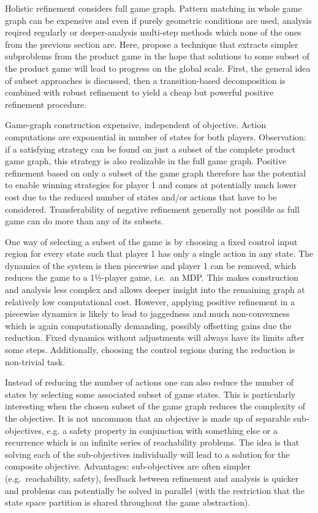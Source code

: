 Holistic refinement considers full game graph.
Pattern matching in whole game graph can be expensive and even if purely geometric conditions are used, analysis reqired regularly or deeper-analysis multi-step methods which none of the ones from the previous section are.
Here, propose a technique that extracts simpler subproblems from the product game in the hope that solutions to some subset of the product game will lead to progress on the global scale.
First, the general idea of subset approaches is discussed, then a transition-based decomposition is combined with robust refinement to yield a cheap but powerful positive refinement procedure.


\startsubsection[title={Subset Approaches}]

    Game-graph construction expensive, independent of objective.
    Action computations are exponential in number of states for both players.
    Observation: if a satisfying strategy can be found on just a subset of the complete product game graph, this strategy is also realizable in the full game graph.
    Positive refinement based on only a subset of the game graph therefore has the potential to enable winning strategies for player 1 and comes at potentially much lower cost due to the reduced number of states and/or actions that have to be considered.
    Transferability of negative refinement generally not possible as full game can do more than any of its subsets.

    One way of selecting a subset of the game is by choosing a fixed control input region for every state such that player 1 has only a single action in any state.
    The dynamics of the system is then piecewise and player 1 can be removed, which reduces the game to a 1½-player game, i.e.\ an MDP.
    This makes construction and analysis less complex and allows deeper insight into the remaining graph at relatively low computational cost.
    However, applying positive refinement in a piecewise dynamics is likely to lead to jaggedness and much non-convexness which is again computationally demanding, possibly offsetting gains due the reduction.
    Fixed dynamics without adjustments will always have its limits after some steps.
    Additionally, choosing the control regions during the reduction is non-trivial task.

    Instead of reducing the number of actions one can also reduce the number of states by selecting some associated subset of game states.
    This is particularly interesting when the chosen subset of the game graph reduces the complexity of the objective.
    It is not uncommon that an objective is made up of separable sub-objectives, e.g. a safety property in conjunction with something else or a recurrence which is an infinite series of reachability problems.
    The idea is that solving each of the sub-objectives individually will lead to a solution for the composite objective.
    Advantages: sub-objectives are often simpler (e.g.\ reachability, safety), feedback between refinement and analysis is quicker and problems can potentially be solved in parallel (with the restriction that the state space partition is shared throughout the game abstraction).

